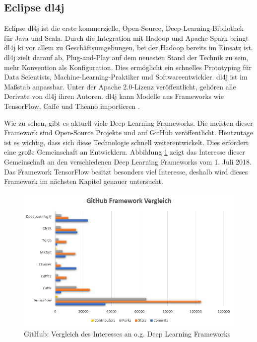 \subsection{Eclipse \acl{dl4j}}
Eclipse \ac{dl4j} ist die erste kommerzielle, Open-Source, Deep-Learning-Bibliothek für Java und Scala. Durch die Integration mit Hadoop und Apache Spark bringt \ac{dl4j} \ac{ki} vor allem zu Geschäftsumgebungen, bei der Hadoop bereits im Einsatz ist. \ac{dl4j} zielt darauf ab, Plug-and-Play auf dem neuesten Stand der Technik zu sein, mehr Konvention als Konfiguration. Dies ermöglicht ein schnelles Prototyping für Data Scientists, Machine-Learning-Praktiker und Softwareentwickler. \ac{dl4j} ist im Maßstab anpassbar. Unter der Apache 2.0-Lizenz veröffentlicht, gehören alle Derivate von \ac{dl4j} ihren Autoren. \ac{dl4j} kann Modelle aus Frameworks wie TensorFlow, Caffe und Theano importieren \cite{dl4j}. \newline

Wie zu sehen, gibt es aktuell viele Deep Learning Frameworks. Die meisten dieser Framework sind Open-Source Projekte und auf GitHub veröffentlicht. Heutzutage ist es wichtig, dass sich diese Technologie schnell weiterentwickelt. Dies erfordert eine große Gemeinschaft an Entwicklern. Abbildung \ref{fig:githubinterestdeeplearning} zeigt das Interesse dieser Gemeinschaft an den verschiedenen Deep Learning Frameworks vom 1. Juli 2018. Das Framework TensorFlow besitzt besonders viel Interesse, deshalb wird dieses Framework im nächsten Kapitel genauer untersucht.

\begin{figure}
	\centering
	\includegraphics[width=0.9\linewidth]{Pictures/GitHubFrameworkVergleich}
	\caption[GitHub: Vergleich des Interesses in verschiedene Deep Learning Frameworks]{GitHub: Vergleich des Interesses an o.g. Deep Learning Frameworks}
	\label{fig:githubinterestdeeplearning}
\end{figure}
